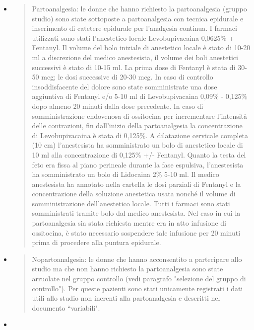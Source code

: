 \documentclass[]{article}
\begin{document}
\begin{itemize}
\item
  \begin{quote}
  {Partoanalgesia:} le donne che hanno richiesto la partoanalgesia
  (gruppo studio) sono state sottoposte a partoanalgesia con tecnica
  epidurale e inserimento di catetere epidurale per l'analgesia
  continua. I farmaci utilizzati sono stati l'anestetico locale
  Levobupivacaina 0,0625\% + Fentanyl. Il volume del bolo iniziale di
  anestetico locale è stato di 10-20 ml a discrezione del medico
  anestesista, il volume dei boli anestetici successivi è stato di 10-15
  ml. La prima dose di Fentanyl è stata di 30-50 mcg; le dosi successive
  di 20-30 mcg. In caso di controllo insoddisfacente del dolore sono
  state somministrate una dose aggiuntiva di Fentanyl e/o 5-10 ml di
  Levobupivacaina 0,09\% - 0,125\% dopo almeno 20 minuti dalla dose
  precedente. In caso di somministrazione endovenosa di ossitocina per
  incrementare l'intensità delle contrazioni, fin dall'inizio della
  partoanalgesia la concentrazione di Levobupivacaina è stata di
  0,125\%. A dilatazione cervicale completa (10 cm) l'anestesista ha
  somministrato un bolo di anestetico locale di 10 ml alla
  concentrazione di 0,125\% +/- Fentanyl. Quanto la testa del feto era
  fissa al piano perineale durante la fase espulsiva, l'anestesista ha
  somministrato un bolo di Lidocaina 2\% 5-10 ml. Il medico anestesista
  ha annotato nella cartella le dosi parziali di Fentanyl e la
  concentrazione della soluzione anestetica usata nonché il volume di
  somministrazione dell'anestetico locale. Tutti i farmaci sono stati
  somministrati tramite bolo dal medico anestesista. Nel caso in cui la
  partoanalgesia sia stata richiesta mentre era in atto infusione di
  ossitocina, è stato necessario sospendere tale infusione per 20 minuti
  prima di procedere alla puntura epidurale.
  \end{quote}
\item
  \begin{quote}
  {Nopartoanalgesia}: le donne che hanno acconsentito a partecipare allo
  studio ma che non hanno richiesto la partoanalgesia sono state
  arruolate nel gruppo controllo (vedi paragrafo "selezione del gruppo
  di controllo"). Per queste pazienti sono stati unicamente registrati i
  dati utili allo studio non inerenti alla partoanalgesia e descritti
  nel documento ``variabili".
  \end{quote}
\item
  \begin{quote}

\end{quote}
\end{itemize}
\end{document}
